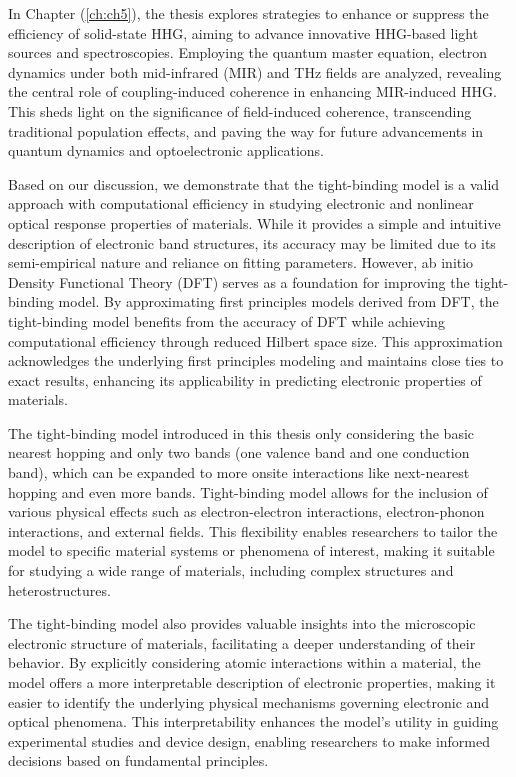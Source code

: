 In Chapter (\ref{ch:ch5}), the thesis explores strategies to enhance or suppress the efficiency of solid-state HHG, aiming to advance innovative HHG-based light sources and spectroscopies. Employing the quantum master equation, electron dynamics under both mid-infrared (MIR) and THz fields are analyzed, revealing the central role of coupling-induced coherence in enhancing MIR-induced HHG. This sheds light on the significance of field-induced coherence, transcending traditional population effects, and paving the way for future advancements in quantum dynamics and optoelectronic applications.

\color{red}

Based on our discussion, we demonstrate that the tight-binding model is a valid approach with computational efficiency in studying electronic and nonlinear optical response properties of materials. While it provides a simple and intuitive description of electronic band structures, its accuracy may be limited due to its semi-empirical nature and reliance on fitting parameters. However, ab initio Density Functional Theory (DFT) serves as a foundation for improving the tight-binding model. By approximating first principles models derived from DFT, the tight-binding model benefits from the accuracy of DFT while achieving computational efficiency through reduced Hilbert space size. This approximation acknowledges the underlying first principles modeling and maintains close ties to exact results, enhancing its applicability in predicting electronic properties of materials.

The tight-binding model introduced in this thesis only considering the basic nearest hopping and only two bands (one valence band and one conduction band), which can be expanded to more onsite interactions like next-nearest hopping and even more bands. Tight-binding model allows for the inclusion of various physical effects such as electron-electron interactions, electron-phonon interactions, and external fields. This flexibility enables researchers to tailor the model to specific material systems or phenomena of interest, making it suitable for studying a wide range of materials, including complex structures and heterostructures.

The tight-binding model also provides valuable insights into the microscopic electronic structure of materials, facilitating a deeper understanding of their behavior. By explicitly considering atomic interactions within a material, the model offers a more interpretable description of electronic properties, making it easier to identify the underlying physical mechanisms governing electronic and optical phenomena. This interpretability enhances the model's utility in guiding experimental studies and device design, enabling researchers to make informed decisions based on fundamental principles.

